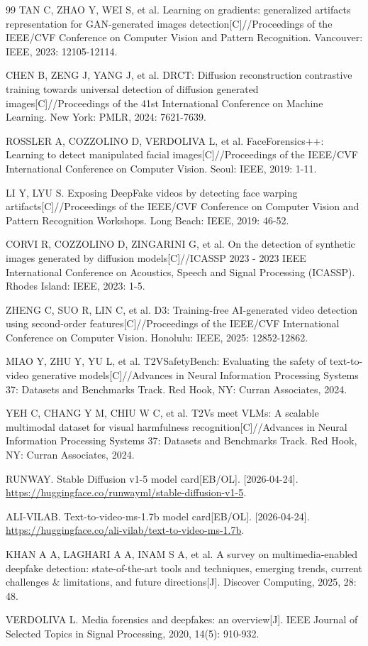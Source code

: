 \begin{thebibliography}{99}
TAN C, ZHAO Y, WEI S, et al. Learning on gradients: generalized artifacts representation for GAN-generated images detection[C]//Proceedings of the IEEE/CVF Conference on Computer Vision and Pattern Recognition. Vancouver: IEEE, 2023: 12105-12114.

CHEN B, ZENG J, YANG J, et al. DRCT: Diffusion reconstruction contrastive training towards universal detection of diffusion generated images[C]//Proceedings of the 41st International Conference on Machine Learning. New York: PMLR, 2024: 7621-7639.

ROSSLER A, COZZOLINO D, VERDOLIVA L, et al. FaceForensics++: Learning to detect manipulated facial images[C]//Proceedings of the IEEE/CVF International Conference on Computer Vision. Seoul: IEEE, 2019: 1-11.

LI Y, LYU S. Exposing DeepFake videos by detecting face warping artifacts[C]//Proceedings of the IEEE/CVF Conference on Computer Vision and Pattern Recognition Workshops. Long Beach: IEEE, 2019: 46-52.

CORVI R, COZZOLINO D, ZINGARINI G, et al. On the detection of synthetic images generated by diffusion models[C]//ICASSP 2023 - 2023 IEEE International Conference on Acoustics, Speech and Signal Processing (ICASSP). Rhodes Island: IEEE, 2023: 1-5.

ZHENG C, SUO R, LIN C, et al. D3: Training-free AI-generated video detection using second-order features[C]//Proceedings of the IEEE/CVF International Conference on Computer Vision. Honolulu: IEEE, 2025: 12852-12862.

MIAO Y, ZHU Y, YU L, et al. T2VSafetyBench: Evaluating the safety of text-to-video generative models[C]//Advances in Neural Information Processing Systems 37: Datasets and Benchmarks Track. Red Hook, NY: Curran Associates, 2024.

YEH C, CHANG Y M, CHIU W C, et al. T2Vs meet VLMs: A scalable multimodal dataset for visual harmfulness recognition[C]//Advances in Neural Information Processing Systems 37: Datasets and Benchmarks Track. Red Hook, NY: Curran Associates, 2024.

RUNWAY. Stable Diffusion v1-5 model card[EB/OL]. [2026-04-24]. \url{https://huggingface.co/runwayml/stable-diffusion-v1-5}.

ALI-VILAB. Text-to-video-ms-1.7b model card[EB/OL]. [2026-04-24]. \url{https://huggingface.co/ali-vilab/text-to-video-ms-1.7b}.

KHAN A A, LAGHARI A A, INAM S A, et al. A survey on multimedia-enabled deepfake detection: state-of-the-art tools and techniques, emerging trends, current challenges \& limitations, and future directions[J]. Discover Computing, 2025, 28: 48.

VERDOLIVA L. Media forensics and deepfakes: an overview[J]. IEEE Journal of Selected Topics in Signal Processing, 2020, 14(5): 910-932.

\end{thebibliography}
